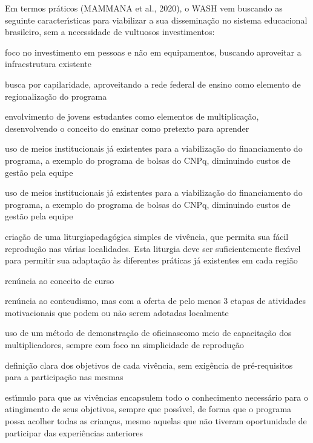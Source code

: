 \documentclass[
12pt,		%
openright,	%
twoside,  %
a4paper,			%
chapter=TITLE,		%
english,			%
french,				%
spanish,			%
brazil				%
]{USPSC-classe/USPSC}
\begin{document}
Em termos pr\'aticos  (MAMMANA et al., 2020), o WASH vem buscando as seguinte caracter\'{\i}sticas para viabilizar a sua dissemina\c{c}\~ao no sistema educacional brasileiro, sem a necessidade de vultuosos investimentos:










\begin{alineas}
\item \textquotedbl foco no investimento em pessoas e n\~ao em equipamentos, buscando aproveitar a infraestrutura existente\textquotedbl 
\item \textquotedbl busca por capilaridade, aproveitando a rede federal de ensino como elemento de regionaliza\c{c}\~ao do programa\textquotedbl 
\item \textquotedbl envolvimento de jovens estudantes como elementos de multiplica\c{c}\~ao, desenvolvendo o conceito do ensinar como pretexto para aprender\textquotedbl 
\item \textquotedbl uso de meios institucionais j\'a existentes para a viabiliza\c{c}\~ao do financiamento do programa, a exemplo do programa de bolsas do CNPq, diminuindo custos de gest\~ao pela equipe\textquotedbl 
\item \textquotedbl uso de meios institucionais j\'a existentes para a viabiliza\c{c}\~ao do financiamento do programa, a exemplo do programa de bolsas do CNPq, diminuindo custos de gest\~ao pela equipe\textquotedbl 
\item \textquotedbl cria\c{c}\~ao de uma \textquotedbl liturgia\textquotedbl  pedag\'ogica simples de viv\^encia, que permita sua f\'acil reprodu\c{c}\~ao nas v\'arias localidades. Esta liturgia deve ser suficientemente flex\'{\i}vel para permitir sua adapta\c{c}\~ao \`as diferentes pr\'aticas j\'a existentes em cada regi\~ao\textquotedbl 
\item \textquotedbl ren\'uncia ao conceito de curso\textquotedbl 
\item \textquotedbl ren\'uncia ao conteudismo, mas com a oferta de pelo menos 3 etapas de atividades motivacionais que podem ou n\~ao serem adotadas localmente\textquotedbl 
\item \textquotedbl uso de um m\'etodo de \textquotedbl demonstra\c{c}\~ao de oficinas\textquotedbl  como meio de capacita\c{c}\~ao dos multiplicadores, sempre com foco na
simplicidade de reprodu\c{c}\~ao\textquotedbl 
\item \textquotedbl defini\c{c}\~ao clara dos objetivos de cada viv\^encia, sem exig\^encia de pr\'e-requisitos para a participa\c{c}\~ao nas mesmas\textquotedbl 
\item \textquotedbl est\'{\i}mulo para que as viv\^encias encapsulem todo o conhecimento necess\'ario para o atingimento de seus objetivos, sempre que poss\'{\i}vel, de forma que o programa possa acolher todas as crian\c{c}as, mesmo aquelas que n\~ao tiveram oportunidade de participar das experi\^encias anteriores\textquotedbl 
\end{alineas}
\end{document}
